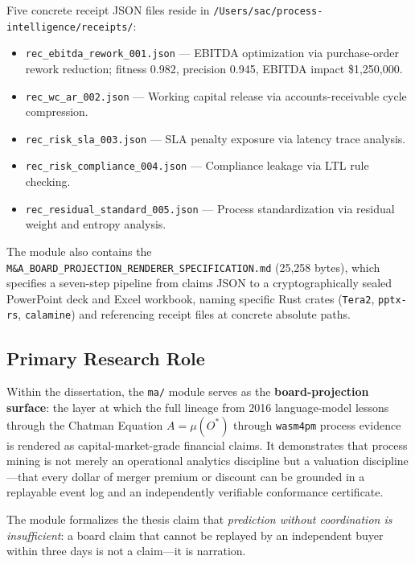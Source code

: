 Five concrete receipt JSON files reside in \texttt{/Users/sac/process-intelligence/receipts/}:

\begin{itemize}
  \item \texttt{rec\_ebitda\_rework\_001.json} --- EBITDA optimization via purchase-order rework
    reduction; fitness 0.982, precision 0.945, EBITDA impact \$1,250,000.
  \item \texttt{rec\_wc\_ar\_002.json} --- Working capital release via accounts-receivable cycle
    compression.
  \item \texttt{rec\_risk\_sla\_003.json} --- SLA penalty exposure via latency trace analysis.
  \item \texttt{rec\_risk\_compliance\_004.json} --- Compliance leakage via LTL rule checking.
  \item \texttt{rec\_residual\_standard\_005.json} --- Process standardization via residual weight
    and entropy analysis.
\end{itemize}

The module also contains the \texttt{M\&A\_BOARD\_PROJECTION\_RENDERER\_SPECIFICATION.md}
(25,258 bytes), which specifies a seven-step pipeline from claims JSON to a cryptographically
sealed PowerPoint deck and Excel workbook, naming specific Rust crates (\texttt{Tera2},
\texttt{pptx-rs}, \texttt{calamine}) and referencing receipt files at concrete absolute paths.

\subsection{Primary Research Role}
\label{sec:ma-identity-role}

Within the dissertation, the \texttt{ma/} module serves as the
\textbf{board-projection surface}: the layer at which the full lineage from 2016 language-model
lessons through the Chatman Equation $A = \mu(O^*)$ through \texttt{wasm4pm} process evidence
is rendered as capital-market-grade financial claims. It demonstrates that process mining is not
merely an operational analytics discipline but a valuation discipline---that every dollar of
merger premium or discount can be grounded in a replayable event log and an independently
verifiable conformance certificate.

The module formalizes the thesis claim that \textit{prediction without coordination is
insufficient}: a board claim that cannot be replayed by an independent buyer within three days
is not a claim---it is narration.

